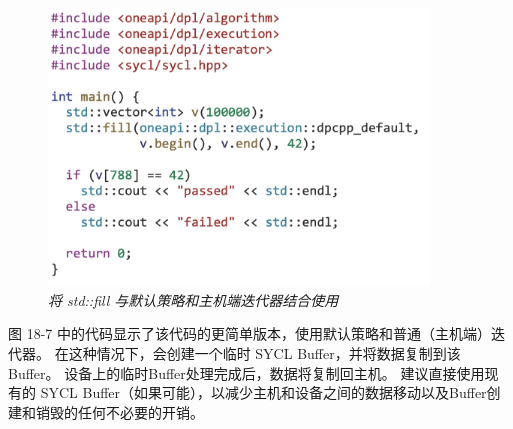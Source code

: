 \begin{figure}[H]
	\centering
	\includegraphics[width=0.9\textwidth]{figs/F18.7.png}
	\caption{\textit{将 std::fill 与默认策略和主机端迭代器结合使用 }}
\end{figure}

图 18-7 中的代码显示了该代码的更简单版本，使用默认策略和普通（主机端）迭代器。 
在这种情况下，会创建一个临时 SYCL Buffer，并将数据复制到该Buffer。 
设备上的临时Buffer处理完成后，数据将复制回主机。 
建议直接使用现有的 SYCL Buffer（如果可能），以减少主机和设备之间的数据移动以及Buffer创建和销毁的任何不必要的开销。

